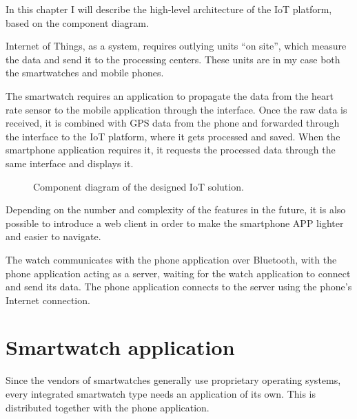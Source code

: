 In this chapter I will describe the high-level architecture of the IoT platform, based on the component diagram.

Internet of Things, as a system, requires outlying units ``on site'', which measure the data and send it to the processing centers.
These units are in my case both the smartwatches and mobile phones.

The smartwatch requires an application to propagate the data from the heart rate sensor to the mobile application through the  interface.
Once the raw data is received, it is combined with GPS data from the phone and forwarded through the  interface to the IoT platform, where it gets processed and saved.
When the smartphone application requires it, it requests the processed data through the same interface and displays it.

\begin{figure}[h]
    \caption{Component diagram of the designed IoT solution.}
\end{figure}

Depending on the number and complexity of the features in the future, it is also possible to introduce a web client in order to make the smartphone APP lighter and easier to navigate.

The watch communicates with the phone application over Bluetooth, with the phone application acting as a server, waiting for the watch application to connect and send its data.
The phone application connects to the server using the phone's Internet connection.

\section{Smartwatch application}
Since the vendors of smartwatches generally use proprietary operating systems, every integrated smartwatch type needs an application of its own.
This is distributed together with the phone application.

